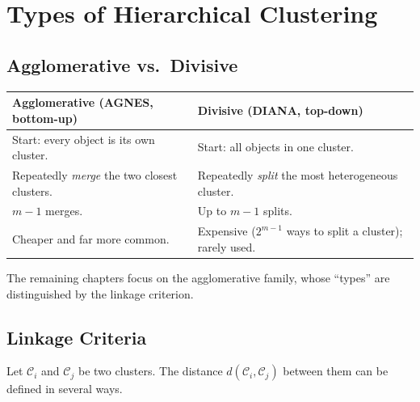 \documentclass[11pt,a4paper]{report}
\theoremstyle{definition}
\theoremstyle{plain}
\theoremstyle{remark}
\newcommand{\C}{\mathcal{C}}
\begin{document}
\chapter{Types of Hierarchical Clustering}
\label{ch:types}

\section{Agglomerative vs.\ Divisive}
\begin{center}
\begin{tabular}{@{}p{6.4cm}p{6.4cm}@{}}
\toprule
\textbf{Agglomerative (AGNES, bottom-up)} & \textbf{Divisive (DIANA, top-down)}\\
\midrule
Start: every object is its own cluster. & Start: all objects in one cluster.\\
Repeatedly \emph{merge} the two closest clusters. & Repeatedly \emph{split} the
most heterogeneous cluster.\\
$m-1$ merges. & Up to $m-1$ splits.\\
Cheaper and far more common. & Expensive ($2^{m-1}$ ways to split a cluster);
rarely used.\\
\bottomrule
\end{tabular}
\end{center}
The remaining chapters focus on the agglomerative family, whose ``types'' are
distinguished by the linkage criterion.

\section{Linkage Criteria}
Let $\C_i$ and $\C_j$ be two clusters. The distance
$d(\C_i,\C_j)$ between them can be defined in several ways.
\end{document}
